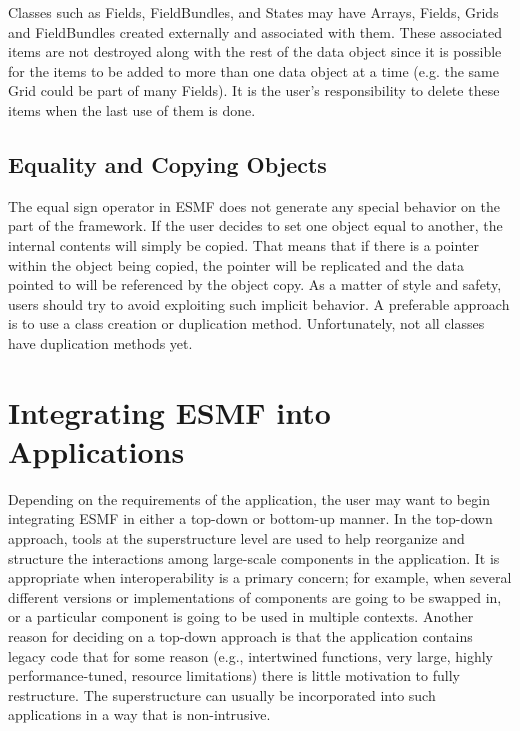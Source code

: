 Classes such as Fields, FieldBundles, and States may have Arrays, 
Fields, Grids and FieldBundles created externally and associated with
them.  These associated items are not destroyed along with the rest  
of the data object since it is possible for the items to be added 
to more than one data object at a time (e.g. the same Grid could 
be part of many Fields).  It is the user's responsibility to delete 
these items when the last use of them is done.

\subsection{Equality and Copying Objects}

The equal sign operator in ESMF does not generate any special 
behavior on the part of the framework.  If the user decides to set
one object equal to another, the internal contents will simply be
copied.  That means that if there is a pointer within the object
being copied, the pointer will be replicated and the data pointed to 
will be referenced by the object copy.  As a matter of style and 
safety, users should try to avoid exploiting such implicit behavior.
A preferable approach is to use a class creation or duplication 
method.  Unfortunately, not all classes have duplication methods yet.

%

\section{Integrating ESMF into Applications}

Depending on the requirements of the application, the user may 
want to begin integrating ESMF in either a top-down or bottom-up 
manner.  In the top-down approach, tools at the superstructure 
level are used to help reorganize and structure the interactions
among large-scale components in the application.  It is appropriate
when interoperability is a primary concern; for example, when 
several different versions or implementations of components are going 
to be swapped in, or a particular component is going to be used 
in multiple contexts.  Another reason for deciding on a top-down 
approach is that the application contains legacy code that for 
some reason (e.g., intertwined functions, very large,
highly performance-tuned, resource limitations) there is little 
motivation to fully restructure.  The superstructure can usually be 
incorporated into such applications in a way that is non-intrusive.

